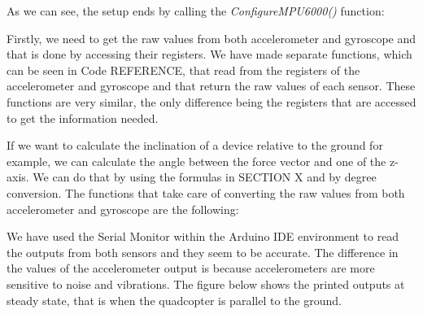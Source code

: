 

As we can see, the setup ends by calling the \textit{ConfigureMPU6000()} function:



Firstly, we need to get the raw values from both accelerometer and gyroscope and that is done by accessing their registers. We have made separate functions, which can be seen in Code REFERENCE, that read from the registers of the accelerometer and gyroscope and that return the raw values of each sensor. These functions are very similar, the only difference being the registers that are accessed to get the information needed. 





If we want to calculate the inclination of a device relative to the ground for example, we can calculate the angle between the force vector and one of the z-axis. We can do that by using the formulas in SECTION X and by degree conversion. The functions that take care of converting the raw values from both accelerometer and gyroscope are the following:





We have used the Serial Monitor within the Arduino IDE environment to read the outputs from both sensors and they seem to be accurate. The difference in the values of the accelerometer output is because accelerometers are more sensitive to noise and vibrations. The figure below shows the printed outputs at steady state, that is when the quadcopter is parallel to the ground.

